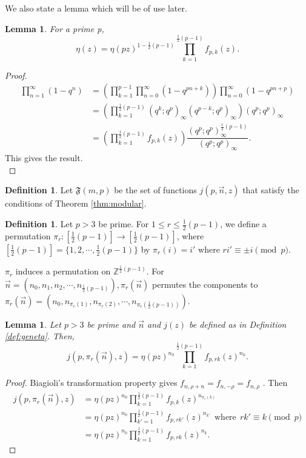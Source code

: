 \documentclass[12pt]{amsart}
\newtheorem{lemma}[theorem]{Lemma}
\theoremstyle{definition}
\newtheorem{definition}[theorem]{Definition}
\theoremstyle{remark}
\numberwithin{equation}{section}
\newcommand\thm[1]{\ref{thm:#1}}
\newcommand\refdef[1]{\ref{def:#1}}
\begin{document}
We also state a lemma which will be of use later.\\
\begin{lemma}\label{lem:eta} For a prime p, 
$$\eta(z)=\eta(pz)^{1-\frac{1}{2}(p-1)}\prod_{k=1}^{\frac{1}{2}(p-1)}f_{p,k}(z).$$
\end{lemma}

\begin{proof}
\begin{align*}
\prod_{n=1}^{\infty}(1-q^n)&=\left(\prod_{k=1}^{p-1}\prod_{n=0}^{\infty}(1-q^{pn+k})\right)\prod_{n=0}^{\infty}(1-q^{pn+p})
\\
&=\left(\prod_{k=1}^{\frac{1}{2}(p-1)}(q^k;q^p)_{\infty}(q^{p-k};q^p)_{\infty}\right)(q^p;q^p)_{\infty}
\\
&=\left(\prod_{k=1}^{\frac{1}{2}(p-1)}f_{p,k}(z)\right)\dfrac{(q^p;q^p)_{\infty}^{\frac{1}{2}(p-1)}}{(q^p;q^p)_{\infty}}.
\end{align*}
This gives the result.\\
\end{proof}

\begin{definition}
Let $\mathfrak{F}(m,p)$ be the set of functions $j(p,\overrightarrow{n},z)$ that satisfy the conditions of Theorem \thm{modular}.\\
\end{definition}

\begin{definition}
\label{def:perm}
Let $p>3$ be prime. For $1\leq r \leq \frac{1}{2}(p-1)$, we define a permutation $\pi_r:[\frac{1}{2}(p-1)]\rightarrow [\frac{1}{2}(p-1)]$, where $[\frac{1}{2}(p-1)]=\{1,2,\cdots,\frac{1}{2}(p-1)\}$ by $\pi_r(i)=i'$ where $ri'\equiv \pm i \pmod{p}$.
\end{definition}
$\pi_r$ induces a permutation on $\mathbb{Z}^{\frac{1}{2}(p-1)}$. For $\overrightarrow{n}=(n_0,n_1,n_2,\cdots ,n_{\frac{1}{2}(p-1)}), \pi_r(\overrightarrow{n})$ permutes the components to $\pi_r(\overrightarrow{n})=(n_0,n_{\pi_r(1)},n_{\pi_r(2)},\cdots ,n_{\pi_r(\frac{1}{2}(p-1))})$.\\


\begin{lemma}\label{lem:jperm}
Let $p>3$ be prime and $\overrightarrow{n}$ and $j(z)$ be defined as in Definition \refdef{geneta}. Then, $$j(p,\pi_r(\overrightarrow{n}),z)=\eta(pz)^{n_0}\prod_{k=1}^{\frac{1}{2}(p-1)}f_{p,rk}(z)^{n_k}.$$
\end{lemma}

\begin{proof} Biagioli's transformation property gives $f_{n,\rho+n}=f_{n,-\rho}=f_{n,\rho}$ \cite[Lemma 2.1, p.278]{Bi89}. Then
\begin{align*}
j(p,\pi_r(\overrightarrow{n}),z)&=\eta(pz)^{n_0}\prod_{k=1}^{\frac{1}{2}(p-1)}f_{p,k}(z)^{n_{\pi_r(k)}}
\\
&=\eta(pz)^{n_0}\prod_{k'=1}^{\frac{1}{2}(p-1)}f_{p,rk'}(z)^{n_{k'}}~~\text{where}~~ rk'\equiv k \pmod{p}
\\
&=\eta(pz)^{n_0}\prod_{k=1}^{\frac{1}{2}(p-1)}f_{p,rk}(z)^{n_{k}}.
\end{align*}
\end{proof}
\end{document}
